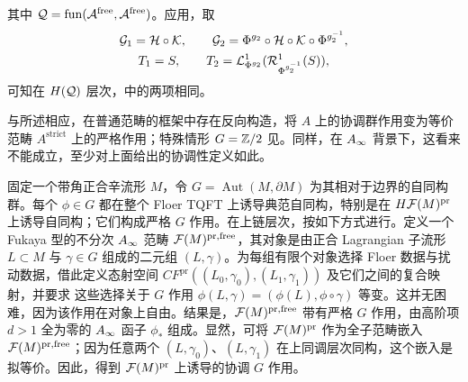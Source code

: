 其中 $\mathcal Q=\operatorname{fun}(\mathcal A^{\mathrm{free}},\mathcal A^{\mathrm{free}})$。应用，取
\[
\begin{gathered}
\mathcal G_1=\mathcal H\circ\mathcal K,\qquad
\mathcal G_2=\Phi^{g_2}\circ\mathcal H\circ\mathcal K\circ\Phi^{g_2^{-1}},\\
T_1=S,\qquad T_2=\mathcal L^1_{\Phi^{g_2}}(\mathcal R^1_{\Phi^{g_2^{-1}}}(S)),
\end{gathered}
\]
可知在 $H(\mathcal Q)$ 层次，中的两项相同。
\begin{note}\label{st:10.2}
与所述相应，在普通范畴的框架中存在反向构造，将 $A$ 上的协调群作用变为等价范畴 $A^{\mathrm{strict}}$ 上的严格作用；特殊情形 $G=\mathbb Z/2$ 见。同样，在 $A_\infty$ 背景下，这看来不能成立，至少对上面给出的协调性定义如此。
\end{note}
固定一个带角正合辛流形 $M$，令 $G=\operatorname{Aut}(M,\partial M)$ 为其相对于边界的自同构群。每个 $\phi\in G$ 都在整个 Floer TQFT 上诱导典范自同构，特别是在 $H\mathcal F(M)^{\mathrm{pr}}$ 上诱导自同构；它们构成严格 $G$ 作用。在上链层次，按如下方式进行。定义一个 Fukaya 型的不分次 $A_\infty$ 范畴 $\mathcal F(M)^{\mathrm{pr},\mathrm{free}}$，其对象是由正合 Lagrangian 子流形 $L\subset M$ 与 $\gamma\in G$ 组成的二元组 $(L,\gamma)$。为每组有限个对象选择 Floer 数据与扰动数据，借此定义态射空间 $CF^{\mathrm{pr}}((L_0,\gamma_0),(L_1,\gamma_1))$ 及它们之间的复合映射，并要求
这些选择关于 $G$ 作用 $\phi(L,\gamma)=(\phi(L),\phi\circ\gamma)$ 等变。这并无困难，因为该作用在对象上自由。结果是，$\mathcal F(M)^{\mathrm{pr},\mathrm{free}}$ 带有严格 $G$ 作用，由高阶项 $d>1$ 全为零的 $A_\infty$ 函子 $\phi_*$ 组成。显然，可将 $\mathcal F(M)^{\mathrm{pr}}$ 作为全子范畴嵌入 $\mathcal F(M)^{\mathrm{pr},\mathrm{free}}$；因为任意两个 $(L,\gamma_0)$、$(L,\gamma_1)$ 在上同调层次同构，这个嵌入是拟等价。因此，得到 $\mathcal F(M)^{\mathrm{pr}}$ 上诱导的协调 $G$ 作用。
